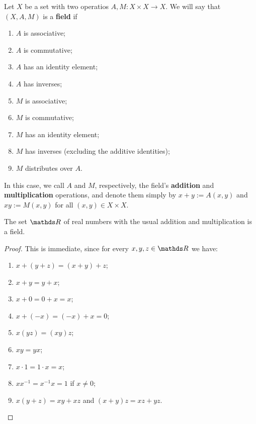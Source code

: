 \begin{df}
	Let $X$ be a set with two operatios $A,M:X\times X\to X$. We will say that $(X,A,M)$ is a \textbf{field} if
	\begin{multicols}{3}
		\begin{enumerate}[(1)]
			\item $A$ is associative;
			\item $A$ is commutative;
			\item $A$ has an identity element;
			\item $A$ has inverses;
			\item $M$ is associative;
			\item $M$ is commutative;
			\item $M$ has an identity element;
			\item $M$ has inverses (excluding the additive identities);
			\item $M$ distributes over $A$.
		\end{enumerate}
	\end{multicols}
	

In this case, we call $A$ and $M$, respectively, the field's \textbf{addition} and \textbf{multiplication} operations, and denote them simply by $x+y:=A(x,y)$ and $xy:=M(x,y)$ for all $(x,y)\in X\times X$.
\end{df}

\begin{prop}
	The set $\R$ of real numbers with the usual addition and multiplication is a field.
\end{prop}
\begin{proof}
	This is immediate, since for every $x,y,z\in\R$ we have:
	\begin{multicols}{3}
		\begin{enumerate}[(1)]
			\item $x+(y+z)=(x+y)+z$;
			\item $x+y=y+x$;
			\item $x+0=0+x=x$;
			\item $x+(-x)=(-x)+x=0$;
			\item $x(yz)=(xy)z$;
			\item $xy=yx$;
			\item $x\cdot 1=1\cdot x=x$;
			\item $xx^{-1}=x^{-1}x=1$ if $x\neq 0$;
			\item $x(y+z)=xy+xz$ and $(x+y)z=xz+yz$.
		\end{enumerate}
	\end{multicols}	
\end{proof}

